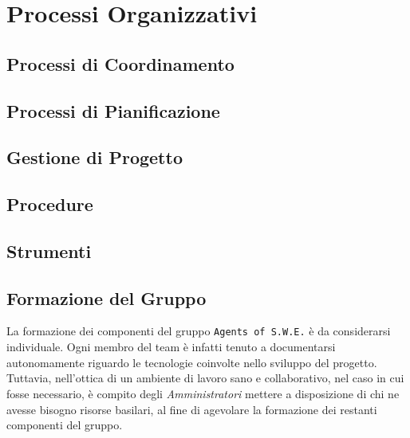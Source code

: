 \section{Processi Organizzativi}\label{ProcessiOrganizzativi}

\subsection{Processi di Coordinamento}\label{ProcessiOrganizzativi_ProcessiCoordinamento}


\subsection{Processi di Pianificazione}



\subsection{Gestione di Progetto}\label{ProcessiOrganizzativi_GestioneProgetto}


\subsection{Procedure}\label{ProcessiOrganizzativi_Procedure}


\subsection{Strumenti}\label{ProcessiOrganizzativi_Strumenti}


\subsection{Formazione del Gruppo}\label{ProcessiOrganizzativi_FormazioneGruppo}
	La formazione dei componenti del gruppo \texttt{Agents of S.W.E.} è da considerarsi individuale. Ogni membro del team è infatti tenuto a documentarsi autonomamente riguardo le tecnologie coinvolte nello sviluppo del 								progetto\glossario. Tuttavia, nell'ottica di un ambiente di lavoro sano e collaborativo, nel caso in cui fosse necessario, è compito degli \textit{Amministratori} mettere a disposizione di chi ne avesse bisogno risorse basilari, al fine di	agevolare la formazione dei restanti componenti del gruppo.
	

